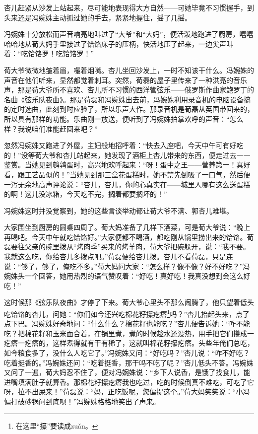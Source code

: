 \par 杏儿赶紧从沙发上站起来，尽可能地表现得大方自然——可她毕竟不习惯握手，到头来还是冯婉姝主动抓过她的手去，紧紧地握住，摇了几摇。
\par 冯婉姝十分放松而声音响亮地叫过了“大爷”和“大妈”，便活泼地跑进了厨房，嘻嘻哈哈地从荀大妈手里接过了饸饹床子的压柄，快活地压了起来，一边尖声叫着：“吃饸饹罗！吃饸饹罗！”
\par 荀大爷微微地皱着眉，嘬着烟嘴。杏儿坐回沙发上，一时不知该干什么。冯婉姝的声音在他们听来，显然都觉着刺耳。突然，荀磊的屋子里传来了一种洪亮的音乐声，那是荀大爷所不喜欢、杏儿所不习惯的西洋管弦乐——俄罗斯作曲家鲍罗丁的名曲《弦乐队夜曲》。那是荀磊和冯婉姝出去前，冯婉姝利用录音机的电脑设备搞的定时选曲，此刻到时应验了，所以乐声大作。那录音机是荀磊从英国带回来的，所以具有那样的功能。乐曲刚一放送，便听到了冯婉姝拍掌欢呼的声音：“怎么样？我说咱们准能赶回来吧？”
\par 忽然冯婉姝又跑进了外屋，主妇般地招呼着：“快去入座吧，今天中午可有好吃的！”没等荀大爷和杏儿站起来，她发现了酒柜上杏儿带来的东西，便走过去一一鉴赏。当她见到鹌鹑蛋时，高兴地欢呼起来：“呀！蛋中之王——营养第一！真好看，跟工艺品似的！”当她见到那三盒花蛋糕时，她不禁先倒吸了一口气，然后便一泻无余地高声评论说：“杏儿，杏儿，你的心真实在——城里人哪有这么送蛋糕的啊！这儿没冰箱，今天吃不完，搁着都要搁坏的！”
\par 冯婉姝这时并没觉察到，她的这些言谈举动都让荀大爷不满、郭杏儿难堪。
\par 大家围坐到厨房的圆桌四周了。荀大妈准备了几样下酒菜，可是荀大爷说：“晚上再喝吧。今天中午就吃饸饹好。”大家便都不喝酒，都吃刚从锅里捞出来的饸饹。荀磊要往父亲的碗里拨从“烤肉季”买来的烤羊肉，荀大爷把碗躲开，说：“我不要。我就这么吃，你给杏儿多拨点吧。”荀磊便给杏儿拨。杏儿不看荀磊，只是连说：“够了，够了，俺吃不多。”荀大妈问大家：“怎么样？像不像？好不好吃？”冯婉姝头一个回答，她用热烈的语气赞叹着：“好吃！真好吃！我真没想到会这么好吃！”
\par 这时候那《弦乐队夜曲》才停了下来。荀大爷心里头不那么闹腾了，他只望着低头吃饸饹的杏儿，问她：“你们如今还兴吃棉花籽攥疙瘩\footnote{在这里“攥”要读成zuǎn。}吗？”杏儿抬起头来，点了点下巴。冯婉姝好奇地问：“什么什么？棉花籽也能吃？”杏儿便告诉她：“咋不能吃？把棉花籽和玉米面合着，在锅里煮，煮的时候趁水还没热，用手把它们攥成一疙瘩一疙瘩的，这样煮得就有干有稀了，这就叫棉花籽攥疙瘩。头些年俺们总吃，如今粮食多了，没什么人吃它了。”冯婉姝又问：“好吃吗？”杏儿说：“咋不好吃？吃着挺香的。”冯婉姝还问：“吃着挺香，那干吗不吃了呢？”杏儿低头不答。冯婉姝又问了一遍，荀大妈忍不住了，便对冯婉姝说：“乡下人说香，是饿了找食儿，能进嘴填满肚子就算香。那棉花籽攥疙瘩我也吃过，吃的时候倒真不难吃，可吃了它呀，拉不出屎来！”荀磊说：“妈，正吃饭呢，您偏提这个。”荀大妈笑笑说：“小冯偏打破砂锅问到底呗！”冯婉姝格格地笑出了声来。
